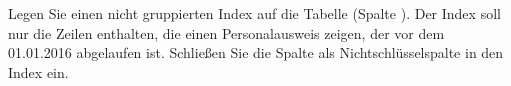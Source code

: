 \item Legen Sie einen nicht gruppierten Index auf die Tabelle
 (Spalte ). Der Index soll nur
die Zeilen enthalten, die einen Personalausweis zeigen, der vor dem 01.01.2016
abgelaufen ist. Schließen Sie die Spalte  als
Nichtschlüsselspalte in den Index ein.
